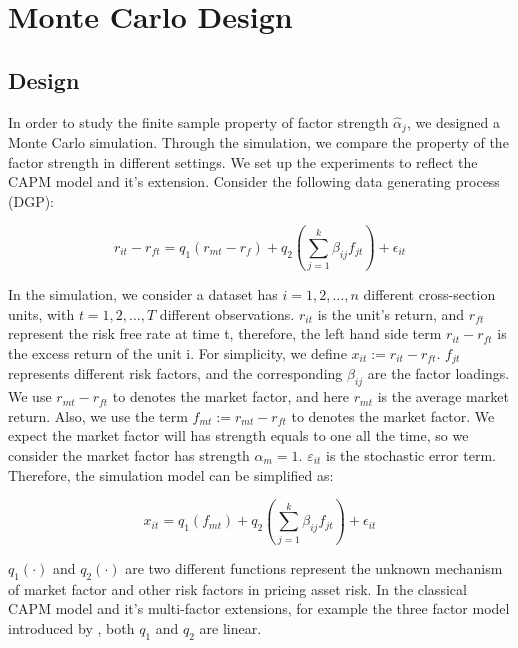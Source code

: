 \documentclass[12pt]{article}
\begin{document}

	\section{Monte Carlo Design}\label{MC}
	\subsection{Design}
In order to study the finite sample property of factor strength $\hat{\alpha}_j$, we designed a Monte Carlo simulation.
Through the simulation, we compare the property of the factor strength in different settings.
We set up the experiments to reflect the CAPM model and it's extension.
Consider the following data generating process (DGP):

	\[ r_{it} - r_{ft} = q_1({r_{mt}} - r_f) + q_2( \sum_{j=1}^k\beta_{ij}f_{jt}) +\epsilon_{it} \]


In the simulation, we consider a dataset has $i = 1, 2,\dots, n$ different cross-section units, with $t= 1, 2,\dots, T$ different observations. 
$r_{it}$ is the unit's return, and $r_{ft}$ represent the risk free rate at time t, therefore, the left hand side term $r_{it} - r_{ft}$ is the excess return of the unit i.
For simplicity, we define $x_{it} := r_{it}- r_{ft}$.
$f_{jt}$ represents different risk factors, and the corresponding  $\beta_{ij}$ are the factor loadings.
We use $r_{mt} - r_{ft}$ to denotes the market factor, and here $r_{mt}$ is the average market return.
Also, we use the term $f_{mt} := r_{mt} - r_{ft}$ to denotes the market factor.
We expect the market factor will has strength equals to one all the time, so we consider the market factor has strength $\alpha_m = 1$.
$\varepsilon_{it}$ is the stochastic error term.
Therefore, the simulation model can be simplified as:

\[ x_{it} = q_1(f_{mt}) + q_2( \sum_{j=1}^k\beta_{ij}f_{jt}) +\epsilon_{it}  \]

$q_1(\cdot)$ and $q_2(\cdot)$ are two different functions represent the unknown mechanism of market factor and other risk factors in pricing asset risk.
In the classical CAPM model and it's multi-factor extensions, for example the three factor model introduced by , both $q_1$ and $q_2$ are linear.
\end{document}

